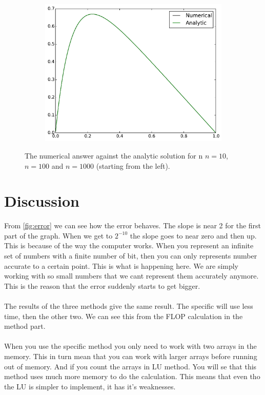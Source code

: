 \documentclass[12pt,norsk,a4paper]{article}
\begin{document}
\begin{figure}[t!]
\begin{subfigure}[t]{0.3\textwidth}
		\includegraphics[width=\linewidth]{bilder/n1000}
		\label{fig:n1000}
    \end{subfigure}
    \label{fig:n}
    \caption{The numerical answer against the analytic solution for n $n=10$,$n=100$ and $n=1000$ (starting from the left). }
\end{figure}

\section{Discussion}

From \ref{fig:error} we can see how the error behaves. The slope is near 2 for the first part of the graph. When we get to $2^{-10}$ the slope goes to near zero and then up. This is because of the way the computer works. When you represent an infinite set of numbers with a finite number of bit, then you can only represents number accurate to a certain point. This is what is happening here. We are simply working with so small numbers that we cant represent them accurately anymore. This is the reason that the error suddenly starts to get bigger. 
\\
\\
The results of the three methods give the same result. The specific will use less time, then the other two. We can see this from the FLOP calculation in the method part.
\\
\\
 When you use the specific method you only need to work with two arrays in the memory. This in turn mean that you can work with larger arrays before running out of memory. And if you count the arrays in LU method. You will se that this method uses much more memory to do the calculation. This means that even tho the LU is simpler to implement, it has it's weaknesses. 
\end{document}
